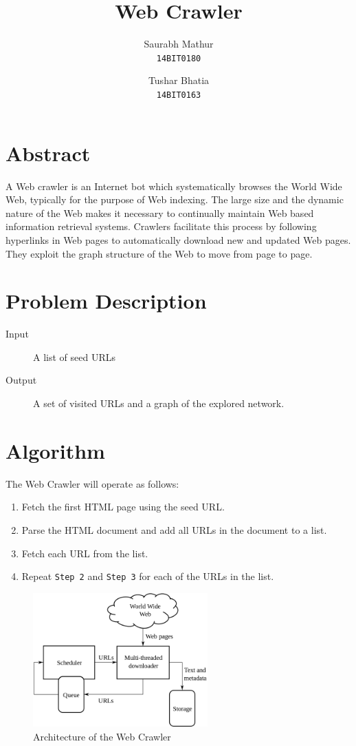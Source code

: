 \documentclass[11.5pt, a4paper]{article}
\title{\huge Web Crawler}
\author{
Saurabh Mathur\\
\texttt{14BIT0180}
\and
Tushar Bhatia\\
\texttt{14BIT0163}
}
\begin{document}
\maketitle



\section*{Abstract}

A Web crawler is an Internet bot which systematically browses the World Wide Web, typically for the purpose of Web indexing.
The large size and the dynamic nature of the Web makes it necessary to continually
maintain Web based information retrieval systems. Crawlers facilitate this process by following
hyperlinks in Web pages to automatically download new and updated Web pages.
They exploit the graph structure of the Web to move from
page to page.

\section*{Problem Description}

\begin{description}
\item[Input] A list of seed URLs
\item[Output] A set of visited URLs and a graph of the explored network.
\end{description}

\section*{Algorithm}
The Web Crawler will operate as follows: 
\begin{enumerate}
\item Fetch the first HTML page using the seed URL.
\item Parse the HTML document and add all URLs in the document to a list.
\item Fetch each URL from the list.
\item Repeat \texttt{Step 2} and \texttt{Step 3} for each of the URLs in the list.
\end{enumerate}

\begin{figure}[h!]
\centering
      \includegraphics[width=0.6\textwidth, fbox]{WebCrawlerArchitecture.png}
  \caption{Architecture of the Web Crawler}

\end{figure}
\end{document}
